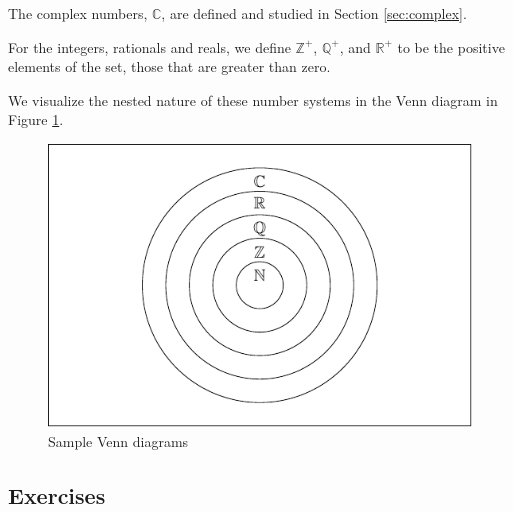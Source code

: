 \documentclass[
]{book}
\theoremstyle{definition}
\theoremstyle{definition}
\theoremstyle{definition}
\theoremstyle{definition}
\theoremstyle{remark}
\begin{document}
The complex numbers, \(\mathbb{C}\), are defined and studied in Section \ref{sec:complex}.

For the integers, rationals and reals, we define \(\mathbb{Z}^+\), \(\mathbb{Q}^+\), and \(\mathbb{R}^+\) to be the positive elements of the set, those that are greater than zero.

We visualize the nested nature of these number systems in the Venn diagram in Figure \ref{fig:venn-numbers}.

\begin{figure}

{\centering \includegraphics[width=0.7\linewidth]{tikz/vennNumberSystems} 

}

\caption{Sample Venn diagrams}\label{fig:venn-numbers}
\end{figure}

\hypertarget{exercises-3}{%
\subsection{Exercises}\label{exercises-3}}
\end{document}
